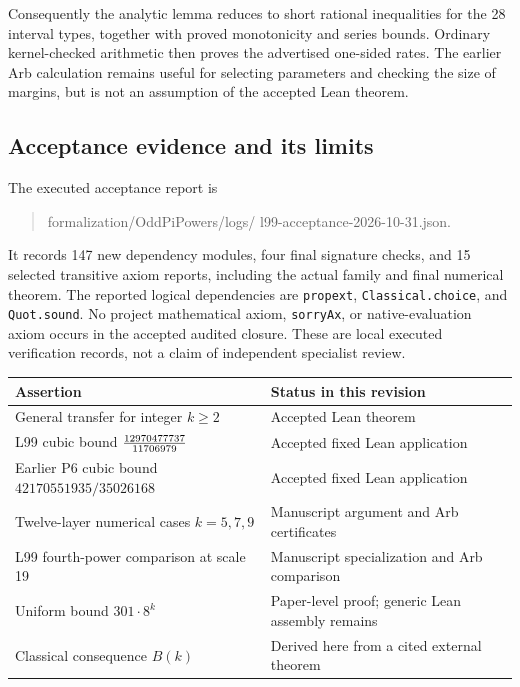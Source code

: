 Consequently the analytic lemma reduces to short rational
inequalities for the 28 interval types, together with proved
monotonicity and series bounds. Ordinary kernel-checked arithmetic
then proves the advertised one-sided rates. The earlier Arb
calculation remains useful for selecting parameters and checking
the size of margins, but is not an assumption of the accepted
Lean theorem.

\subsection{Acceptance evidence and its limits}

The executed acceptance report is
\begin{quote}\small\ttfamily
formalization/OddPiPowers/logs/\allowbreak
l99-acceptance-2026-10-31.json.
\end{quote}
It records 147 new dependency modules, four final signature checks,
and 15 selected transitive axiom reports, including the actual
family and final numerical theorem. The reported logical
dependencies are \texttt{propext}, \texttt{Classical.choice}, and
\texttt{Quot.sound}. No project mathematical axiom, \texttt{sorryAx},
or native-evaluation axiom occurs in the accepted audited closure.
These are local executed verification records, not a claim of
independent specialist review.

\begin{center}
\begin{tabular}{>{\raggedright\arraybackslash}p{72mm}>{\raggedright\arraybackslash}p{65mm}}
\toprule
Assertion&Status in this revision\\
\midrule
General transfer for integer \(k\ge2\)&Accepted Lean theorem\\
L99 cubic bound \(\frac{12970477737}{11706979}\)&Accepted fixed Lean application\\
Earlier P6 cubic bound \(42170551935/35026168\)&Accepted fixed Lean application\\
Twelve-layer numerical cases \(k=5,7,9\)&Manuscript argument and Arb certificates\\
L99 fourth-power comparison at scale 19&Manuscript specialization and Arb comparison\\
Uniform bound \(301\cdot8^k\)&Paper-level proof; generic Lean assembly remains\\
Classical consequence \(B(k)\)&Derived here from a cited external theorem\\
\bottomrule
\end{tabular}
\end{center}

